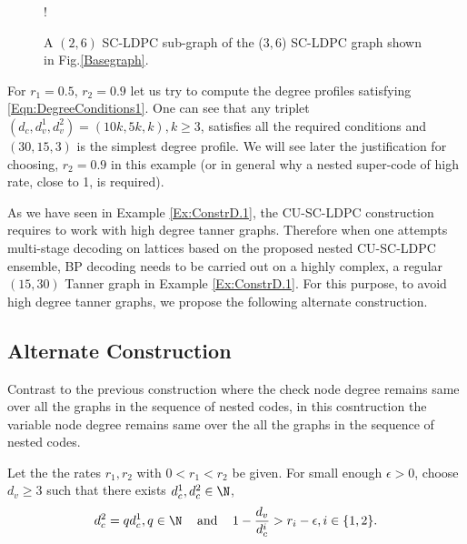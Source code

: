 \documentclass[journal]{IEEEtran}
\begin{document}
\begin{figure}[b]
\centering
\resizebox {\columnwidth} {!} {

}
\caption{A $(2,6)$ SC-LDPC sub-graph of the ($3,6$) SC-LDPC graph shown in Fig.\ref{Basegraph}.}
\label{BaseGraph_sup}
\end{figure}

\begin{Example}\label{Ex:ConstrD.1}
For $r_{1}=0.5$, $r_{2}=0.9$ let us try to compute the degree profiles satisfying \eqref{Eqn:DegreeConditions1}. One can see that      any triplet $(d_{c},d_{v}^{1},d_{v}^{2})=(10k, 5k, k), k\geq 3$, satisfies all the required conditions and $(30, 15, 3)$ is the simplest degree profile. We will see later the justification for choosing, $r_{2}=0.9$ in this example (or in general why a nested super-code of high rate, close to 1, is required).
\end{Example}
As we have seen in Example \ref{Ex:ConstrD.1}, the CU-SC-LDPC construction requires to work with high degree tanner graphs. Therefore when one attempts multi-stage decoding on lattices based on the proposed nested CU-SC-LDPC ensemble, BP decoding needs to be carried out on a highly complex, a regular $(15,30)$ Tanner graph in Example \ref{Ex:ConstrD.1}. For this purpose, to avoid high degree tanner graphs, we propose the following alternate construction.

\subsection{Alternate Construction}
Contrast to the previous construction where the check node degree remains same over all the graphs in the sequence of nested codes, in this cosntruction the variable node degree remains same over the all the graphs in the sequence of nested codes.

Let the the rates $r_{1}, r_{2}$ with $0<r_{1}<r_{2}$ be given. For small enough $\epsilon >0$, choose $d_{v}\geq 3$ such that there exists $d_{c}^{1},d_{c}^{2}\in \N$,
\begin{align}
		d_{c}^{2}=q d_{c}^{1}, q\in \N \hspace{0.3cm} \text{  and } \hspace{0.3cm}   1-\frac{d_{v}}{d_{c}^{i}}>r_{i}-\epsilon, i\in \{1,2\}.
\label{Eqn:DegreeConditions2}
\end{align}

\end{document}
